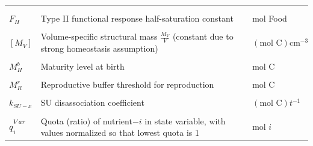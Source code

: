 \documentclass[
]{article}
\begin{document}
\begin{table}[!h]
\begin{tabular}{>{\centering\arraybackslash}m{1.5cm}>{\raggedright\arraybackslash}m{12cm}>{\centering\arraybackslash}m{2.5cm}}
\addlinespace[0.3em]
\multicolumn{3}{l}{\textbf{Parameters}}\\
\cellcolor{gray!10}{\hspace{1em}$\{J_{X{A_M}}\}$} & \cellcolor{gray!10}{Surface-area specific maximum ingestion rate} & \cellcolor{gray!10}{$(\text{mol Food})({{V^{2/3}}*t})^{-1}$}\\
\hspace{1em}$F_H$ & Type II functional response half-saturation constant & mol Food\\
\cellcolor{gray!10}{\hspace{1em}$\{F_M\}$} & \cellcolor{gray!10}{Type II functional response surface-area search rate} & \cellcolor{gray!10}{$({\text{cm}^2})(t^{-1})$}\\
\hspace{1em}$[M_V]$ & Volume-specific structural mass $\frac{M_V}{V}$ (constant due to strong homeostasis assumption) & $(\text{mol C}){\text{cm}^{-3}}$\\
\cellcolor{gray!10}{\hspace{1em}$\large{\dot{r}}$} & \cellcolor{gray!10}{Specific growth rate $(\frac{1}{M_V}\frac{d{M_V}}{dt})$} & \cellcolor{gray!10}{$t^{-1}$}\\
\hspace{1em}$M_{H}^{b}$ & Maturity level at birth & $\text{mol C}$\\
\cellcolor{gray!10}{\hspace{1em}$M_{H}^{p}$} & \cellcolor{gray!10}{Maturity threshold for puberty} & \cellcolor{gray!10}{$\text{mol C}$}\\
\hspace{1em}$M_{R}^{r}$ & Reproductive buffer threshold for reproduction & $\text{mol C}$\\
\cellcolor{gray!10}{\hspace{1em}$k_{\scriptscriptstyle M\text{ or }J}$} & \cellcolor{gray!10}{Maintenance rate coefficient (M for somatic, J for maturity)} & \cellcolor{gray!10}{$t^{-1}$}\\
\hspace{1em}$k_{\scriptscriptstyle SU-x}$ & SU disassociation coefficient & $(\text{mol C})t^{-1}$\\
\cellcolor{gray!10}{\hspace{1em}$Y_{1*2}$} & \cellcolor{gray!10}{Yield of transformation/conversion of $Var1$ into $Var2$} & \cellcolor{gray!10}{$-$}\\
\hspace{1em}$\large{q\strut^{Var}_{i}}$ & Quota (ratio) of nutrient$-i$ in state variable, with values normalized so that lowest quota is 1 & mol $i$\\

\end{tabular}
\end{table}
\end{document}
